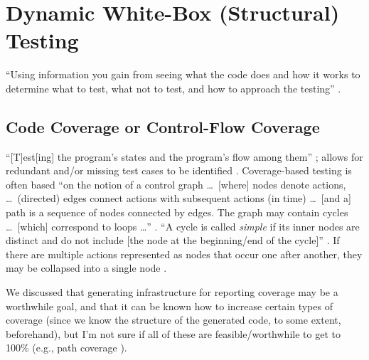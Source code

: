 \section[Dynamic White-Box (Structural) Testing]{Dynamic White-Box (Structural)
  Testing \citep[pp.~105-121]{Patton2006}}

``Using information you gain from seeing what the code does and how it works to
determine what to test, what not to test, and how to approach the testing''
\citep[p.~106]{Patton2006}.

\subsection[Code Coverage or Control-Flow Coverage]{Code Coverage
    \citep[pp.~117-121]{Patton2006} or Control-Flow Coverage
    \citep[pp.~421-424]{vanVliet2000}}

``[T]est[ing] the program's states and the program's flow among them''
\citep[p.~117]{Patton2006}; allows for redundant and/or missing test
cases to be identified \citep[p.~118]{Patton2006}. Coverage-based
testing is often based ``on the notion of a control graph \dots\ [where]
nodes denote actions, \dots\ (directed) edges connect actions with
subsequent actions (in time) \dots\ [and a] path is a sequence of nodes
connected by edges. The graph may contain cycles \dots\ [which] correspond
to loops \dots'' \citep[pp.~420-421]{vanVliet2000}. ``A cycle is
called \emph{simple} if its inner nodes are distinct and do not include
    [the node at the beginning/end of the cycle]''
\citep[p.~421,~emphasis added]{vanVliet2000}. If there are
multiple actions represented as nodes that occur one after another, they may
be collapsed into a single node \citep[p.~421]{vanVliet2000}.

We discussed that
generating infrastructure for reporting coverage may be a worthwhile goal, and
that it can be known how to increase certain types of coverage (since we know
the structure of the generated code, to some extent, beforehand), but I'm
not sure if all of these are feasible/worthwhile to get to 100\% (e.g., path
coverage \citep[p.~421]{vanVliet2000}).


